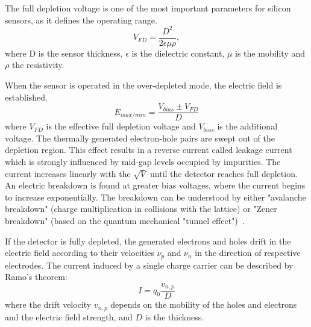 The full depletion voltage is one of the most important parameters for silicon sensors, as it defines the operating range. 
\begin{equation}
    V_{FD} = \frac{D^{2}}{2\epsilon \mu \rho},
\end{equation}
where D is the sensor thickness, $\epsilon$ is the dielectric constant, $\mu$ is the mobility and $\rho$ the resistivity.

When the sensor is operated in the over-depleted mode, the electric field is established.
\begin{equation}
    E_{max/min} = \frac{V_{bias}\pm V_{FD}}{D}
\end{equation}
where $V_{FD}$ is the effective full depletion voltage and $V_{bias}$ is the additional voltage. The thermally generated electron-hole pairs are swept out of the depletion region. This effect results in a reverse current called leakage current which is strongly influenced by mid-gap levels occupied by impurities. The current increases linearly with the $\sqrt{V}$ until the detector reaches full depletion. An electric breakdown is found at greater bias voltages, where the current begins to increase exponentially. The breakdown can be understood by either "avalanche breakdown" (charge multiplication in collisions with the lattice) or "Zener breakdown" (based on the quantum mechanical "tunnel effect")~\cite{Hartmann:2017gzy}.

If the detector is fully depleted, the generated electrons and holes drift in the electric field according to their velocities $\nu_{p}$ and $\nu_{n}$ in the direction of respective electrodes. The current induced by a single charge carrier can be described by Ramo's theorem:
\begin{equation}
    I = q_{0}\frac{v_{n,p}}{D}
\end{equation}
where the drift velocity $v_{n,p}$ depends on the mobility of the holes and electrons and the electric field strength, and $D$ is the thickness.

